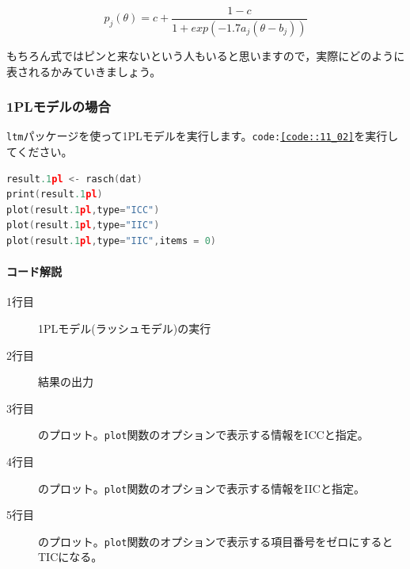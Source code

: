 \documentclass{ltjsbook}
\begin{document}
\[ p_j(\theta) =c+ \frac{1-c}{1+exp(-1.7 a_j(\theta -b_j))} \]

もちろん式ではピンと来ないという人もいると思いますので，実際にどのように表されるかみていきましょう。
\subsubsection{1PLモデルの場合}

\texttt{ltm}パッケージを使って1PLモデルを実行します。\texttt{code:\ref{code::11_02}}を実行してください。

\begin{lstlisting}[language=c++,label={code::11_02},caption={1PLモデルの実行}]
result.1pl <- rasch(dat)
print(result.1pl)
plot(result.1pl,type="ICC")
plot(result.1pl,type="IIC")
plot(result.1pl,type="IIC",items = 0)
\end{lstlisting}
    
\paragraph{コード解説}
\begin{description}
        \item[1行目] 1PLモデル(ラッシュモデル)の実行
        \item[2行目] 結果の出力
        \item[3行目] のプロット。\texttt{plot}関数のオプションで表示する情報をICCと指定。
        \item[4行目] のプロット。\texttt{plot}関数のオプションで表示する情報をIICと指定。
        \item[5行目] のプロット。\texttt{plot}関数のオプションで表示する項目番号をゼロにするとTICになる。
\end{description}
\end{document}

